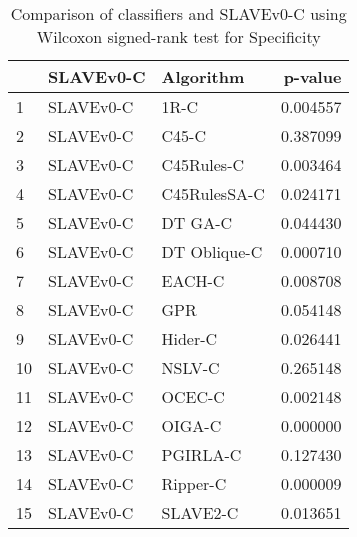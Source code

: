 \begin{table}
\footnotesize
\caption{Comparison of classifiers and SLAVEv0-C using Wilcoxon signed-rank test for Specificity}
\label{tab:SLAVEv0-C wilcoxon Specificity comparison}
\begin{tabular}{lllr}
\hline
 & SLAVEv0-C & Algorithm & p-value \\
\hline
1 & SLAVEv0-C & 1R-C & 0.004557 \\
2 & SLAVEv0-C & C45-C & 0.387099 \\
3 & SLAVEv0-C & C45Rules-C & 0.003464 \\
4 & SLAVEv0-C & C45RulesSA-C & 0.024171 \\
5 & SLAVEv0-C & DT GA-C & 0.044430 \\
6 & SLAVEv0-C & DT Oblique-C & 0.000710 \\
7 & SLAVEv0-C & EACH-C & 0.008708 \\
8 & SLAVEv0-C & GPR & 0.054148 \\
9 & SLAVEv0-C & Hider-C & 0.026441 \\
10 & SLAVEv0-C & NSLV-C & 0.265148 \\
11 & SLAVEv0-C & OCEC-C & 0.002148 \\
12 & SLAVEv0-C & OIGA-C & 0.000000 \\
13 & SLAVEv0-C & PGIRLA-C & 0.127430 \\
14 & SLAVEv0-C & Ripper-C & 0.000009 \\
15 & SLAVEv0-C & SLAVE2-C & 0.013651 \\
\hline
\end{tabular}
\end{table}

